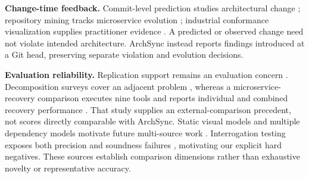 \textbf{Change-time feedback.} Commit-level prediction studies architectural change \cite{commits2025}; repository mining tracks microservice evolution \cite{evolution2024}; industrial conformance visualization supplies practitioner evidence \cite{thermofisher2025}. A predicted or observed change need not violate intended architecture. ArchSync instead reports findings introduced at a Git head, preserving separate violation and evolution decisions.

\textbf{Evaluation reliability.} Replication support remains an evaluation concern \cite{konersmann2022replicability}. Decomposition surveys cover an adjacent problem \cite{abgaz2023decomposition}, whereas a microservice-recovery comparison executes nine tools and reports individual and combined recovery performance \cite{schneider2025comparison}. That study supplies an external-comparison precedent, not scores directly comparable with ArchSync. Static visual models and multiple dependency models motivate future multi-source work \cite{staticmodels2024,dependencies2024}. Interrogation testing exposes both precision and soundness failures \cite{kaindlstorfer2024interrogation}, motivating our explicit hard negatives. These sources establish comparison dimensions rather than exhaustive novelty or representative accuracy.
